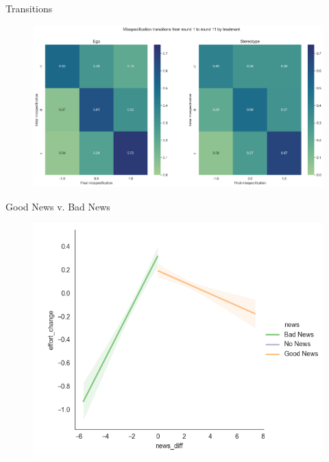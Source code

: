 \documentclass[aspectratio=169]{beamer}
\begin{document}
\begin{frame}{Transitions}
    \begin{figure}
        \centering
        \includegraphics[scale=.35]{misspecification_transitions_treatment.png}
    \end{figure}
    
\end{frame}

\begin{frame}{Good News v. Bad News}
    \label{goodvbad}
    \begin{figure}
        \centering
        \includegraphics[scale=.5]{effort_change_news.png}
    \end{figure}

\end{frame}
\end{document}

